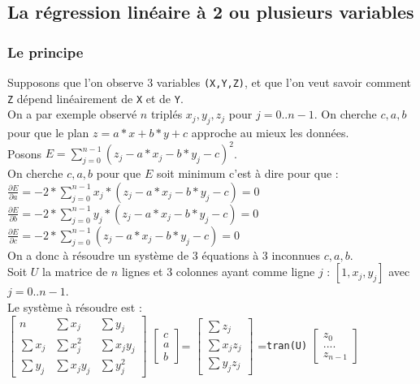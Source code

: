 \documentclass[a4paper,11pt]{book}
\begin{document}
\subsection{La r\'egression lin\'eaire \`a 2 ou plusieurs variables}\label{sec:linreg2}
\subsubsection{Le principe}
Supposons que l'on observe 3 variables {\tt (X,Y,Z)}, et que l'on veut savoir 
comment {\tt Z} d\'epend lin\'eairement de {\tt X} et de {\tt Y}.\\
On a par exemple observ\'e $n$ tripl\'es $x_j,y_j,z_j$ pour $j=0..n-1$. On 
cherche $c,a,b$ pour que le plan $z=a*x+b*y+c$ approche au mieux les 
donn\'ees.\\
Posons $E=\sum_{j=0}^{n-1} (z_j-a*x_j-b*y_j-c)^2$.\\
On cherche $c,a,b$ pour que $E$ soit minimum c'est \`a dire pour que :\\
$\frac{\partial E}{\partial a}=-2*\sum_{j=0}^{n-1} x_j*(z_j-a*x_j-b*y_j-c)=0$\\
$\frac{\partial E}{\partial b}=-2*\sum_{j=0}^{n-1} y_j*(z_j-a*x_j-b*y_j-c)=0$\\
$\frac{\partial E}{\partial c}=-2*\sum_{j=0}^{n-1} (z_j-a*x_j-b*y_j-c)=0$\\
On a donc \`a r\'esoudre un syst\`eme de 3 \'equations \`a 3 inconnues 
$c,a,b$.\\
Soit $U$ la matrice de  $n$ lignes et 3 colonnes ayant comme ligne $j$ :
 $[1,x_j,y_j]$ avec $j=0..n-1$.\\
Le syst\`eme \`a r\'esoudre est :\\
$\left[
\begin{array}{ccc}
n & \sum x_j & \sum y_j\\
\sum x_j & \sum x_j^2&\sum x_jy_j\\
\sum y_j & \sum x_jy_j &\sum y_j^2
\end{array}
\right]$
$\left[
\begin{array}{c}
c\\
a\\
b
\end{array}
\right]
$=
$\left[
\begin{array}{c}
\sum z_j \\
\sum x_j z_j\\
\sum y_j z_j
\end{array}
\right]$
={\tt tran(U)}
$\left[
\begin{array}{c}
z_0 \\
....\\
z_{n-1}
\end{array}
\right]$
\end{document}
